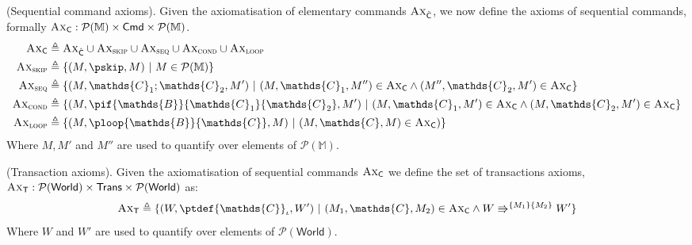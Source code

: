\param (Sequential command axioms). Given the axiomatisation of elementary commands $\textsc{Ax}_{\hat{\mathsf{C}}}$, we now define the axioms of sequential commands, formally $\textsc{Ax}_\mathsf{C} : \mathcal{P}(\mathbb{M}) \times \mathsf{Cmd} \times \mathcal{P}(\mathbb{M})$.
\begin{align*}
	\textsc{Ax}_\mathsf{C} &\triangleq \textsc{Ax}_{\hat{\mathsf{C}}} \cup \textsc{Ax}_{\textsc{skip}} \cup \textsc{Ax}_{\textsc{seq}} \cup \textsc{Ax}_{\textsc{cond}} \cup \textsc{Ax}_{\textsc{loop}}
	\\
	\textsc{Ax}_{\textsc{skip}} &\triangleq \{ (M, \pskip, M)\ |\ M \in \mathcal{P}(\mathbb{M}) \}
	\\
	\textsc{Ax}_{\textsc{seq}} &\triangleq \{ (M, \mathds{C}_1 ; \mathds{C}_2, M')\ |\ (M, \mathds{C}_1, M'') \in \textsc{Ax}_\mathsf{C} \land (M'', \mathds{C}_2, M') \in \textsc{Ax}_\mathsf{C} \}
	\\
	\textsc{Ax}_{\textsc{cond}} &\triangleq \{ (M, \pif{\mathds{B}}{\mathds{C}_1}{\mathds{C}_2}, M')\ |\ (M, \mathds{C}_1, M') \in \textsc{Ax}_\mathsf{C} \land (M, \mathds{C}_2, M') \in \textsc{Ax}_\mathsf{C} \}
	\\
	\textsc{Ax}_{\textsc{loop}} &\triangleq \{ (M, \ploop{\mathds{B}}{\mathds{C}}, M)\ |\ (M, \mathds{C}, M) \in \textsc{Ax}_\mathsf{C}) \}
\end{align*}
Where $M, M'$ and $M''$ are used to quantify over elements of $\mathcal{P}(\mathbb{M})$.

\param (Transaction axioms). Given the axiomatisation of sequential commands $\textsc{Ax}_\mathsf{C}$ we define the set of transactions axioms, $\textsc{Ax}_\mathsf{T} : \mathcal{P}(\mathsf{World}) \times \mathsf{Trans} \times \mathcal{P}(\mathsf{World})$ as:
\[
	\textsc{Ax}_\mathsf{T} \triangleq \{ (W, \ptdef{\mathds{C}}_\iota, W')\ |\ (M_1, \mathds{C}, M_2) \in \textsc{Ax}_\mathsf{C} \land W \Rrightarrow^{\{M_1\}\{M_2\}} W' \}
\]
Where $W$ and $W'$ are used to quantify over elements of $\mathcal{P}(\mathsf{World})$.

